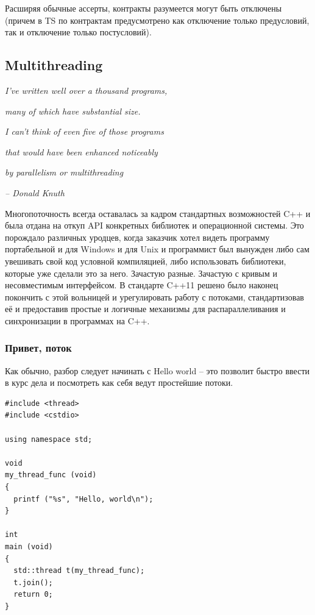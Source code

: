 \documentclass[a4paper,12pt,oneside]{article}
\begin{document}
Расширяя обычные ассерты, контракты разумеется могут быть отключены (причем в TS по контрактам предусмотрено как отключение только предусловий, так и отключение только постусловий).

\pagebreak
\subsection{Multithreading}\label{subsec:multithread}

\hfill\textit{I’ve written well over a thousand programs,}

\hfill\textit{many of which have substantial size.}

\hfill\textit{I can’t think of even five of those programs}

\hfill\textit{that would have been enhanced noticeably}

\hfill\textit{by parallelism or multithreading}{\vspace{0.5em}}

\hfill\textit{-- Donald Knuth}

Многопоточность всегда оставалась за кадром стандартных возможностей C++ и была отдана на откуп API конкретных библиотек и операционной системы. Это порождало различных уродцев, когда заказчик хотел видеть программу портабельной и для Windows и для Unix и программист был вынужден либо сам увешивать свой код условной компиляцией, либо использовать библиотеки, которые уже сделали это за него. Зачастую разные. Зачастую с кривым и несовместимым интерфейсом. В стандарте C++11 решено было наконец покончить с этой вольницей и урегулировать работу с потоками, стандартизовав её и предоставив простые и логичные механизмы для распараллеливания и синхронизации в программах на C++.

\subsubsection{Привет, поток}

Как обычно, разбор следует начинать с Hello world -- это позволит быстро ввести в курс дела и посмотреть как себя ведут простейшие потоки.

\begin{lstlisting}
#include <thread>
#include <cstdio>

using namespace std;

void 
my_thread_func (void)
{
  printf ("%s", "Hello, world\n");
}

int 
main (void)
{
  std::thread t(my_thread_func);
  t.join();
  return 0;
}
\end{lstlisting}
\end{document}
